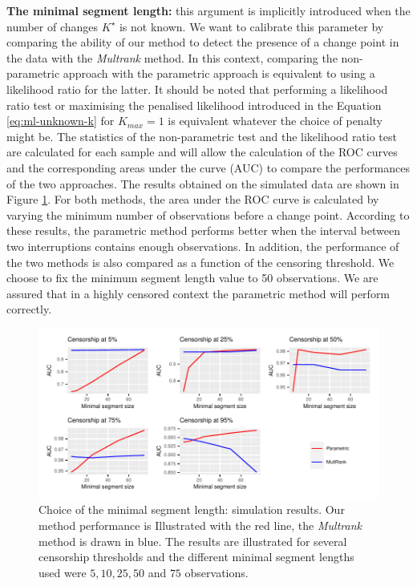 \textbf{The minimal segment length:} this argument is implicitly introduced when the number of changes $K^\star$ is not known. We want to calibrate this parameter by comparing the ability of our method to detect the presence of a change point in the data with the \textit{Multrank} method. In this context, comparing the non-parametric approach with the parametric approach is equivalent to using a likelihood ratio for the latter. It should be noted that performing a likelihood ratio test or maximising the penalised likelihood introduced in the Equation \ref{eq:ml-unknown-k} for $K_{max} = 1$ is equivalent whatever the choice of penalty might be. The statistics of the non-parametric test and the likelihood ratio test are calculated for each sample and will allow the calculation of the ROC curves \cite{Fawcett2006} and the corresponding areas under the curve (AUC) to compare the performances of the two approaches. The results obtained on the simulated data are shown in Figure \ref{fig:sim_minseg}. For both methods, the area under the ROC curve is calculated by varying the minimum number of observations before a change point. According to these results, the parametric method performs better when the interval between two interruptions contains enough observations. In addition, the performance of the two methods is also compared as a function of the censoring threshold. We choose to fix the minimum segment length value to 50 observations. We are assured that in a highly censored context the parametric method will perform correctly.   
    \begin{figure}[ht]
    \centering
    \includegraphics{figs/Chap4/sim_minseg.pdf}
    \caption{Choice of the minimal segment length: simulation results. Our method performance is Illustrated with the red line, the \textit{Multrank} method is drawn in blue. The results are illustrated for several censorship thresholds and the different minimal segment lengths used were $5,10,25,50$ and $75$ observations.}
    \label{fig:sim_minseg}
\end{figure}

